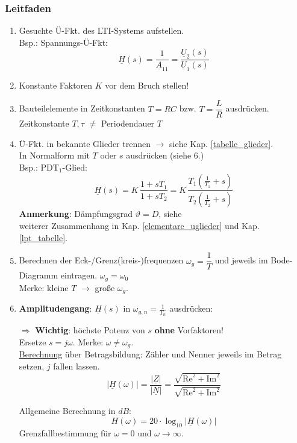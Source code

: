  \subsubsection{Leitfaden}
 \begin{enumerate}
 	\item Gesuchte Ü-Fkt. des LTI-Systems aufstellen.\\
 	Bsp.: Spannungs-Ü-Fkt: $$\underline{H}(s)=\frac{1}{\underline{A}_{11}} = \frac{\underline{U}_2(s)}{\underline{U}_1(s)}$$
 	
 	\item Konstante Faktoren $K$ vor dem Bruch stellen!
 	\item Bauteilelemente in Zeitkonstanten $T=RC$ bzw.  $T=\dfrac{L}{R}$ ausdrücken. {\small Zeitkonstante $T, \tau$ $\neq $ Periodendauer $T$}
 	\item Ü-Fkt. in bekannte Glieder trennen $\rightarrow$ siehe Kap. \ref{tabelle_glieder}. \\
 	In Normalform mit $T$ oder $s$ ausdrücken (siehe 6.) \\
 	Bsp.: PDT$_1$-Glied: 
 	$$\underline{H}(s)=K\,\frac{1+sT_1}{1+sT_2}=K\,\frac{T_1(\frac{1}{T_1}+s)}{T_2(\frac{1}{T_2}+s)}$$
 	\textbf{Anmerkung}: Dämpfungsgrad $\vartheta=D$, siehe\\ weiterer Zusammenhang in Kap. \ref{elementare_uglieder} und Kap. \ref{lpt_tabelle}.
 	\item Berechnen der Eck-/Grenz(kreis-)frequenzen $\omega_{g} = \dfrac{1}{T}$ und jeweils im Bode-Diagramm eintragen. $\omega_g = \omega_0$\\
 	Merke: kleine $T$ $\rightarrow$ große $\omega_g$.
 	
 	\item \textbf{Amplitudengang}:
 	$\underline{H}(s)$ in $\omega_{g,n}=\frac{1}{T_n}$ ausdrücken:
 	
 	$\Rightarrow$ \textbf{Wichtig}: höchste Potenz von $s$ \textbf{ohne} Vorfaktoren!\\
 	Ersetze $s=j\omega$. \quad Merke:  $\omega\neq\omega_g$.\\
 	
  	\underline{Berechnung} über Betragsbildung: Zähler und Nenner jeweils im Betrag setzen, $j$ fallen lassen.
 	$$ |\underline{H}(\omega)| = \frac{|\underline{Z}|}{|\underline{N}|} = \frac{\sqrt{\text{Re}^2+\text{Im}^2}}{\sqrt{\text{Re}^2+\text{Im}^2}} $$
 	
 	Allgemeine Berechnung in $dB$:
 	$$H(\omega) = 20\cdot\log_{10}|\underline{H}(\omega)|$$
 	Grenzfallbestimmung für $\omega=0$ und $\omega \rightarrow \infty$.\\
 	

\end{enumerate}
